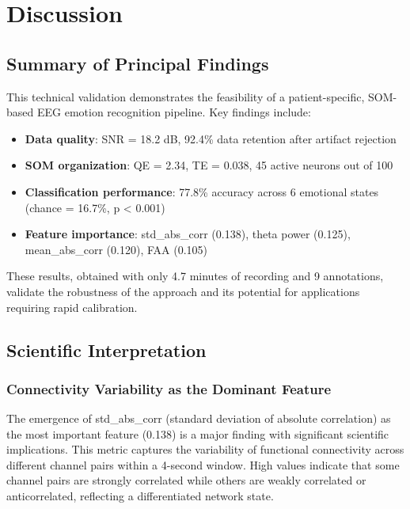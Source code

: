 \section{Discussion}

\subsection{Summary of Principal Findings}

This technical validation demonstrates the feasibility of a patient-specific, SOM-based EEG emotion recognition pipeline. Key findings include:

\begin{itemize}
    \item \textbf{Data quality}: SNR = 18.2 dB, 92.4\% data retention after artifact rejection
    \item \textbf{SOM organization}: QE = 2.34, TE = 0.038, 45 active neurons out of 100
    \item \textbf{Classification performance}: 77.8\% accuracy across 6 emotional states (chance = 16.7\%, p < 0.001)
    \item \textbf{Feature importance}: std\_abs\_corr (0.138), theta power (0.125), mean\_abs\_corr (0.120), FAA (0.105)
\end{itemize}

These results, obtained with only 4.7 minutes of recording and 9 annotations, validate the robustness of the approach and its potential for applications requiring rapid calibration.

\subsection{Scientific Interpretation}

\subsubsection{Connectivity Variability as the Dominant Feature}

The emergence of std\_abs\_corr (standard deviation of absolute correlation) as the most important feature (0.138) is a major finding with significant scientific implications. This metric captures the variability of functional connectivity across different channel pairs within a 4-second window. High values indicate that some channel pairs are strongly correlated while others are weakly correlated or anticorrelated, reflecting a differentiated network state.


